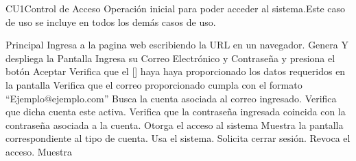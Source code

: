  \begin{UseCase}{CU1}{Control de Acceso}{
		Operación inicial para poder acceder al sistema.Este caso de uso se incluye en todos los demás casos de uso.
	}
	\end{UseCase}
	\begin{UCtrayectoria}{Principal}
		\UCpaso[\UCactor] Ingresa a la pagina web escribiendo la URL en un navegador.
		\UCpaso Genera Y despliega la Pantalla 
		\UCpaso [\UCactor] Ingresa su Correo Electrónico y Contraseña y presiona el botón Aceptar
		\UCpaso Verifica que el [\UCactor] haya haya proporcionado los datos requeridos en la pantalla 
		\UCpaso Verifica que el correo proporcionado cumpla con el formato ``Ejemplo@ejemplo.com'' 
		\UCpaso Busca la cuenta asociada al correo ingresado. 
		\UCpaso Verifica que dicha cuenta este activa. 
		\UCpaso Verifica que la contraseña ingresada coincida con la contraseña asociada a la cuenta.
		\UCpaso Otorga el acceso al sistema
		\UCpaso Muestra la pantalla correspondiente al tipo de cuenta.		
		\UCpaso [\UCactor] Usa el sistema.
		\UCpaso [\UCactor] Solicita cerrar sesión.
		\UCpaso Revoca el acceso.
		\UCpaso Muestra 		
	\end{UCtrayectoria}

